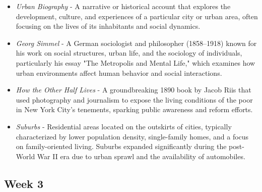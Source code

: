 \documentclass[12pt]{article}
\begin{document}
\begin{itemize}
    \item \textit{Urban Biography} - A narrative or historical account that explores the development, culture, and experiences of a particular city or urban area, often focusing on the lives of its inhabitants and social dynamics.
    
    \item \textit{Georg Simmel} - A German sociologist and philosopher (1858–1918) known for his work on social structures, urban life, and the sociology of individuals, particularly his essay "The Metropolis and Mental Life," which examines how urban environments affect human behavior and social interactions.
    
    \item \textit{How the Other Half Lives} - A groundbreaking 1890 book by Jacob Riis that used photography and journalism to expose the living conditions of the poor in New York City's tenements, sparking public awareness and reform efforts.
    
    \item \textit{Suburbs} - Residential areas located on the outskirts of cities, typically characterized by lower population density, single-family homes, and a focus on family-oriented living. Suburbs expanded significantly during the post-World War II era due to urban sprawl and the availability of automobiles.
\end{itemize}

\subsection*{Week 3}
\end{document}
